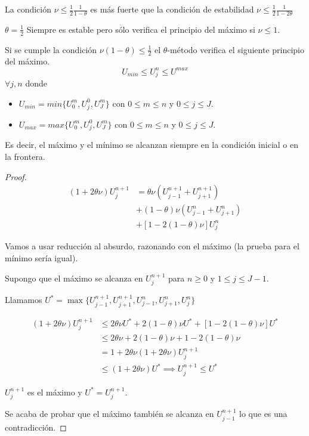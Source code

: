 \begin{obs}
	La condición $\nu\le\frac{1}{2}\frac{1}{1-\theta}$
	es más fuerte que la condición de estabilidad $\nu\le\frac{1}{2}\frac{1}{1-2\theta}$
\end{obs}

\begin{example} $\theta = \frac{1}{2}$ Siempre es estable pero sólo verifica el principio del máximo si $\nu\le 1$.
\end{example}

\begin{theorem}
	Si se cumple la condición $\nu(1-\theta)\le\frac{1}{2}$ el $\theta$-método verifica el siguiente principio del máximo.
	$$U_{min} \le U_j^n\le U^{max}$$
	$\forall j,n$ donde 
	\begin{itemize}
		\item $U_{min} = min\{U_0^m, U_j^0, U_J^m\}$ con $0\le m\le n$ y $0 \le j \le J$.
		\item $U_{max} = max\{U_0^m, U_j^0, U_J^m\}$ con $0\le m\le n$ y $0 \le j \le J$.
	\end{itemize}
	Es decir, el máximo y el mínimo se alcanzan siempre en la condición inicial o en la frontera.
\end{theorem}
\begin{proof}
	\begin{align*}
	(1+2\theta\nu)U_j^{n+1} & = \theta\nu(U_{j-1}^{n+1}+U_{j+1}^{n+1})\\
	& + (1-\theta)\nu(U_{j-1}^{n}+U_{j+1}^{n}) \\
	& +	[1-2(1-\theta)\nu]U_{j}^{n}
	\end{align*}
	
	Vamos a usar reducción al absurdo, razonando con el máximo (la prueba para el mínimo sería igual).
	
	Supongo que el máximo se alcanza en $U_j^{n+1}$ para $n\ge 0$ y $1\le j \le J-1$. 
	
	Llamamos $U^\ast = \max\{ U_{j-1}^{n+1},U_{j+1}^{n+1},U_{j-1}^{n},U_{j+1}^{n},U_{j}^{n} \}$
	
	\begin{align*}
	(1+2\theta\nu)U_{j}^{n+1} & \le 2\theta\nu U^\ast + 2(1-\theta)\nu U^\ast + [1-2(1-\theta)\nu]U^\ast\\
	& \le 2\theta\nu + 2(1-\theta) \nu + 1-2(1-\theta)\nu \\
	& = 1+2\theta\nu (1+2\theta\nu)U_{j}^{n+1}\\
	& \le(1+2\theta\nu)U^\ast \implies U_{j}^{n+1} \le U^\ast
	\end{align*}
	
	$U_{j}^{n+1}$ es el máximo y $U^\ast = U_{j}^{n+1}$.
	
	Se acaba de probar que el máximo también se alcanza en $U_{j-1}^{n+1}$ lo que es una contradicción.
\end{proof}

